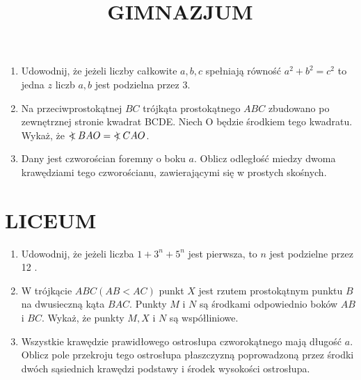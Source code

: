 \documentclass[10pt]{article}
\title{GIMNAZJUM }
\author{}
\date{}
\newcommand\Varangle{\mathop{{<\!\!\!\!\!\text{\small)}}\:}\nolimits}
\begin{document}
\maketitle
\begin{enumerate}
  \item Udowodnij, że jeżeli liczby całkowite \(a, b, c\) spełniają równość \(a^{2}+b^{2}=c^{2}\) to jedna \(z\) liczb \(a, b\) jest podzielna przez 3.
  \item Na przeciwprostokątnej \(B C\) trójkąta prostokątnego \(A B C\) zbudowano po zewnętrznej stronie kwadrat BCDE. Niech O będzie środkiem tego kwadratu. Wykaż, że \(\Varangle B A O=\Varangle C A O\).
  \item Dany jest czworościan foremny o boku \(a\). Oblicz odległość miedzy dwoma krawędziami tego czworościanu, zawierającymi się w prostych skośnych.
\end{enumerate}

\section*{LICEUM}
\begin{enumerate}
  \item Udowodnij, że jeżeli liczba \(1+3^{n}+5^{n}\) jest pierwsza, to \(n\) jest podzielne przez 12 .
  \item W trójkącie \(A B C(A B<A C)\) punkt \(X\) jest rzutem prostokątnym punktu \(B\) na dwusieczną kąta \(B A C\). Punkty \(M\) i \(N\) są środkami odpowiednio boków \(A B\) i \(B C\). Wykaż, że punkty \(M, X\) i \(N\) są współliniowe.
  \item Wszystkie krawędzie prawidłowego ostrosłupa czworokątnego mają długość \(a\). Oblicz pole przekroju tego ostrosłupa płaszczyzną poprowadzoną przez środki dwóch sąsiednich krawędzi podstawy i środek wysokości ostrosłupa.
\end{enumerate}
\end{document}
